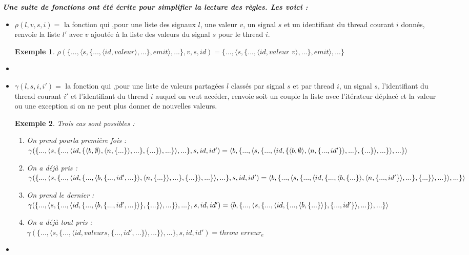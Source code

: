 \documentclass[10pt,a4paper]{report}
\newtheorem{ex}{Exemple}
\begin{document}
	
	\textbf{\textit{Une suite de fonctions ont été écrite pour simplifier la lecture des règles. Les voici :}}
	\smallbreak
	\begin{itemize}
		\item[] $\rho(l,v,s,i) =$ la fonction qui ,pour une liste des signaux $l$, une valeur $v$, un signal $s$ et un identifiant du thread courant $i$ donnés, renvoie la liste $l'$ avec $v$ ajoutée à la liste des valeurs du signal $s$ pour le thread $i$.
		\begin{ex}
			$\rho(\{...,\langle s,\{...,\langle id,valeur\rangle,...\},emit\rangle,...\},v,s,id) = \{...,\langle s,\{...,\langle id,valeur$ $v\rangle,...\},emit\rangle,...\}$
		\end{ex}
		\item[] 
		
		\item[] $\gamma(l,s,i,i') =$ la fonction qui ,pour une liste de valeurs partagées $l$ classés par signal $s$ et par thread $i$, un signal $s$, l'identifiant du thread courant $i'$ et l'identifiant du thread $i$ auquel on veut accéder, renvoie soit un couple la liste avec l'itérateur déplacé et la valeur ou une exception si on ne peut plus donner de nouvelles valeurs. 
		\begin{ex} 
			Trois cas sont possibles :
			\begin{enumerate}
				\item On prend pourla première fois :
				\\$\gamma(\{...,\langle s,\{...,\langle id,\{\langle b,\emptyset\rangle,\langle n,\{...\}\rangle,...\},\{...\}\rangle,...\}\rangle,...\},s,id,id') = 
				\\\langle b , \{...,\langle s,\{...,\langle id,\{\langle b,\emptyset\rangle,\langle n,\{...,id'\}\rangle,...\},\{...\}\rangle,...\}\rangle,...\} \rangle$
				\item On a déjà pris :
				\\$\gamma(\{...,\langle s,\{...,\langle id,\{...,\langle b,\{...,id',...\}\rangle,\langle n,\{...\}\rangle,...\},\{...\}\rangle,...\}\rangle,...\},s,id,id') = 
				\\\langle b , \{...,\langle s,\{...,\langle id,\{...,\langle b,\{...\}\rangle,\langle n,\{...,id'\}\rangle,...\},\{...\}\rangle,...\}\rangle,...\} \rangle$
				\item On prend le dernier :
				\\$\gamma(\{...,\langle s,\{...,\langle id,\{...,\langle b,\{...,id',...\}\rangle\},\{...\}\rangle,...\}\rangle,...\},s,id,id') = 
				\\\langle b , \{...,\langle s,\{...,\langle id,\{...,\langle b,\{...\}\rangle\},\{...,id'\}\rangle,...\}\rangle,...\} \rangle$
				\item On a déjà tout pris : 
				\\$\gamma(\{...,\langle s,\{...,\langle id,valeurs,\{...,id',...\}\rangle,...\}\rangle,...\},s,id,id') = throw$ $erreur_{e}$
			\end{enumerate} 
		\end{ex}
		\item[]
		

\end{itemize}
\end{document}
